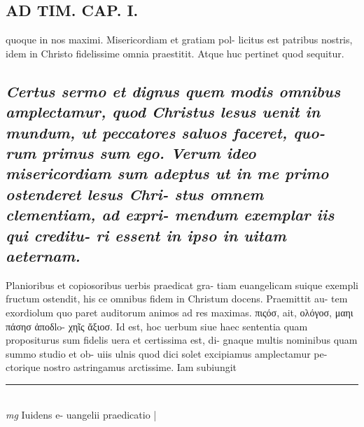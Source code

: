 \documentclass{article}
\begin{document}
\begin{pages}
\section*{AD TIM. CAP. I. }
\marginpar{[ p.104 ]}\pstart quoque in nos maximi. Misericordiam et gratiam pol- licitus est patribus nostris, idem in Christo fidelissime omnia praestitit. Atque huc pertinet quod sequitur.  \pend
{}
{}
\subsection*{\textit{Certus sermo et dignus quem modis omnibus amplectamur, quod  Christus lesus uenit in mundum, ut peccatores saluos faceret, quo- rum primus sum ego. Verum ideo misericordiam sum adeptus ut in me primo ostenderet lesus Chri- stus omnem clementiam, ad expri- mendum exemplar iis qui creditu- ri essent in ipso in uitam aeternam. }}\pstart Planioribus et copiosoribus uerbis praedicat gra- tiam euangelicam suique exempli fructum ostendit, his ce omnibus fidem in Christum docens. Praemittit au- tem exordiolum quo paret auditorum animos ad res maximas. πιςόσ, ait, ολόγοσ, μαηι πάσησ ἀποδlo- χηῖς ἄξιοσ. Id est, hoc uerbum siue haec sententia quam propositurus sum fidelis uera et certissima est, di- gnaque multis nominibus quam summo studio et ob- uiis ulnis quod dici solet excipiamus amplectamur pe- ctorique nostro astringamus arctissime. Iam subiungit  \pend
\vspace{0.5cm}\noindent
\vspace{0.2cm}\rule{1cm}{0.2pt}\\ 
\hspace{0.2cm}\textit{mg}
\footnotesize Iuidens e- uangelii praedicatio 
\normalsize| 

\end{pages}
\end{document}

